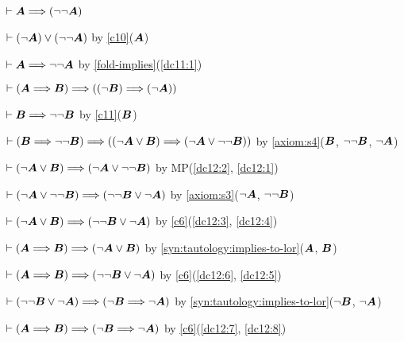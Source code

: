 \begin{dc}\label{c11}%
$\vdash\boldsymbol{A}\Longrightarrow(\neg\neg\boldsymbol{A})$
\end{dc}

\begin{pf}
\item\label{dc11:1}\Pf $\vdash(\neg\boldsymbol{A})\lor(\neg\neg\boldsymbol{A})$
  by \ref{c10}($\boldsymbol{A}$)
\item $\vdash\boldsymbol{A}\Longrightarrow\neg\neg\boldsymbol{A}$
  by \ref{fold-implies}(\ref{dc11:1})
\end{pf}

\begin{dc}\label{c12}%
$\vdash(\boldsymbol{A}\Longrightarrow\boldsymbol{B})\Longrightarrow((\neg\boldsymbol{B})\Longrightarrow(\neg\boldsymbol{A}))$
\end{dc}

\begin{pf}
\item\label{dc12:1}\Pf $\vdash\boldsymbol{B}\Longrightarrow\neg\neg\boldsymbol{B}$
  by \ref{c11}($\boldsymbol{B}$)
\item\label{dc12:2} $\vdash(\boldsymbol{B}\Longrightarrow\neg\neg\boldsymbol{B})\Longrightarrow((\neg\boldsymbol{A}\lor\boldsymbol{B})\Longrightarrow(\neg\boldsymbol{A}\lor\neg\neg\boldsymbol{B}))$
  by \ref{axiom:s4}($\boldsymbol{B}$, $\neg\neg\boldsymbol{B}$, $\neg\boldsymbol{A}$)
\item\label{dc12:3} $\vdash(\neg\boldsymbol{A}\lor\boldsymbol{B})\Longrightarrow(\neg\boldsymbol{A}\lor\neg\neg\boldsymbol{B})$
  by MP(\ref{dc12:2}, \ref{dc12:1})
\item\label{dc12:4} $\vdash(\neg\boldsymbol{A}\lor\neg\neg\boldsymbol{B})\Longrightarrow(\neg\neg\boldsymbol{B}\lor\neg\boldsymbol{A})$
  by \ref{axiom:s3}($\neg\boldsymbol{A}$, $\neg\neg\boldsymbol{B}$)
\item\label{dc12:5} $\vdash(\neg\boldsymbol{A}\lor\boldsymbol{B})\Longrightarrow(\neg\neg\boldsymbol{B}\lor\neg\boldsymbol{A})$
  by \ref{c6}(\ref{dc12:3}, \ref{dc12:4})
\item\label{dc12:6} $\vdash(\boldsymbol{A}\Longrightarrow\boldsymbol{B})\Longrightarrow(\neg\boldsymbol{A}\lor\boldsymbol{B})$
  by \ref{syn:tautology:implies-to-lor}($\boldsymbol{A}$, $\boldsymbol{B}$)
\item\label{dc12:7} $\vdash(\boldsymbol{A}\Longrightarrow\boldsymbol{B})\Longrightarrow(\neg\neg\boldsymbol{B}\lor\neg\boldsymbol{A})$
  by \ref{c6}(\ref{dc12:6}, \ref{dc12:5})
\item\label{dc12:8} $\vdash(\neg\neg\boldsymbol{B}\lor\neg\boldsymbol{A})\Longrightarrow(\neg\boldsymbol{B}\Longrightarrow\neg\boldsymbol{A})$
  by \ref{syn:tautology:implies-to-lor}($\neg\boldsymbol{B}$, $\neg\boldsymbol{A}$)
\item $\vdash(\boldsymbol{A}\Longrightarrow\boldsymbol{B})\Longrightarrow(\neg\boldsymbol{B}\Longrightarrow\neg\boldsymbol{A})$
  by \ref{c6}(\ref{dc12:7}, \ref{dc12:8})
\end{pf}

